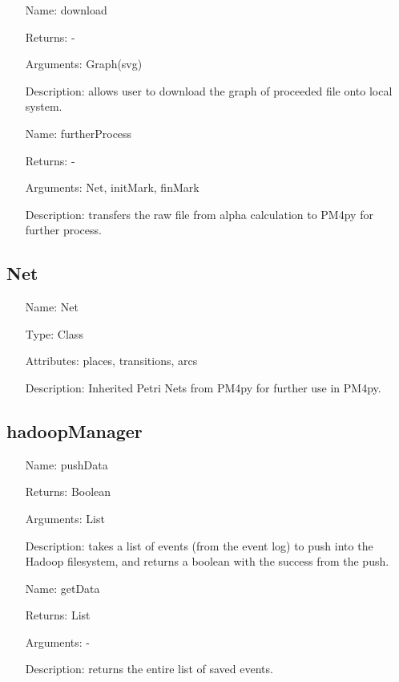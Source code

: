 \documentclass[runningheads]{llncs}
\begin{document}
\begin{itemize}
	\item[Name:] download
	\item[Returns:] -
	\item[Arguments:] Graph(svg)
	\item[Description:] allows user to download the graph of proceeded file onto local system.
\end{itemize}

\begin{itemize}
	\item[Name:] furtherProcess
	\item[Returns:] -
	\item[Arguments:] Net, initMark, finMark
	\item[Description:] transfers the raw file from alpha calculation to PM4py for further process.
\end{itemize}

\subsection{Net}
\begin{itemize}
	\item[Name:] Net
	\item[Type:] Class
	\item[Attributes:] places, transitions, arcs
	\item[Description:] Inherited Petri Nets from PM4py for further use in PM4py.
\end{itemize}
\subsection{hadoopManager}
\begin{itemize}
\item[Name:] pushData
\item[Returns:] Boolean
\item[Arguments:] List
\item[Description:] takes a list of events (from the event log) to push into the Hadoop filesystem, and returns a boolean with the success from the push.
\end{itemize}

\begin{itemize}
\item[Name:] getData
\item[Returns:] List
\item[Arguments:] -
\item[Description:] returns the entire list of saved events.
\end{itemize}
\end{document}
